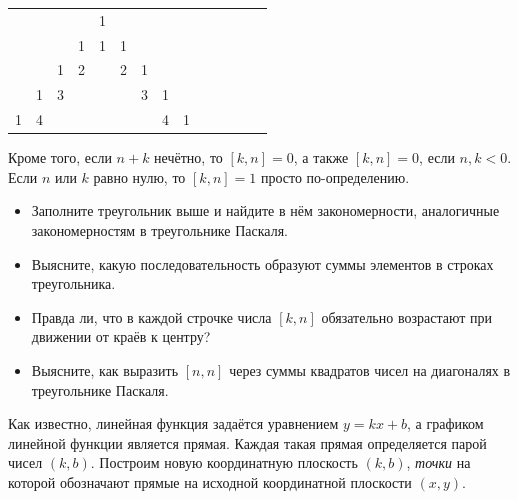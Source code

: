 \documentclass[10pt]{scrbook} \usepackage{modules/nonstahp_book}
\begin{document}
\begin{center}
\begin{tabular}{c c c c c c c c c c c c c c}
 &  &  &  & 1&  &  &  & \\%
 &  &  & 1& 1& 1&  &  & \\ %
 &  & 1& 2&  & 2& 1&  & \\%
 & 1& 3&  &  &  & 3& 1& \\%
1& 4&  &  &  &  &  & 4& 1%
\end{tabular}
\end{center}
Кроме того, если $n+k$ нечётно, то $[k,n] = 0$, а также $[k,n] = 0$, если $n,k < 0$. Если $n$ или $k$ равно нулю, то $[k,n] = 1$ просто по-определению.
\begin{itemize}
\item Заполните треугольник выше и найдите в нём закономерности, аналогичные закономерностям в треугольнике Паскаля.
\item Выясните, какую последовательность образуют суммы элементов в строках треугольника.
\item Правда ли, что в каждой строчке числа $[k,n]$ обязательно возрастают при движении от краёв к центру?
\item Выясните, как выразить $[n,n]$ через суммы квадратов чисел на диагоналях в треугольнике Паскаля.
\end{itemize}



Как известно, линейная функция задаётся уравнением $y = kx + b$, а графиком линейной функции является прямая. Каждая такая прямая определяется парой чисел $(k,b)$. Построим новую координатную плоскость $(k,b)$, {\it точки} на которой обозначают прямые на исходной координатной плоскости $(x,y)$. 
\end{document}
